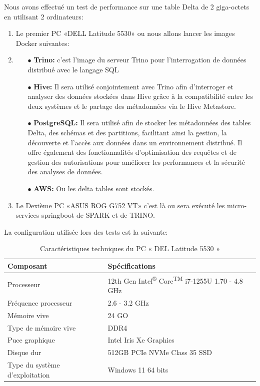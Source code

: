 Nous avons effectué un test de performance sur une table Delta de 2 giga-octets en utilisant 2 ordinateurs:
\begin{enumerate}
    \item Le premier PC «DELL Latitude 5530» ou nous allons lancer les images Docker suivantes:
    \item \begin{enumerate}
        \item[$\bullet$] \textbf{Trino:} c’est l’image du serveur Trino pour l'interrogation de données distribué avec le langage SQL 
        \item[$\bullet$] \textbf{Hive:} Il sera utilisé conjointement avec Trino afin d’interroger et analyser des données stockées dans Hive grâce à la compatibilité entre les deux systèmes et le partage des métadonnées via le Hive Metastore.
        \item[$\bullet$] \textbf{PostgreSQL:} Il sera utilisé afin de stocker les métadonnées des tables Delta, des schémas et des partitions, facilitant ainsi la gestion, la découverte et l'accès aux données dans un environnement distribué. Il offre également des fonctionnalités d'optimisation des requêtes et de gestion des autorisations pour améliorer les performances et la sécurité des analyses de données.
        \item[$\bullet$] \textbf{AWS:} Ou les delta tables sont stockés.
    \end{enumerate}
    \item Le Dexième PC «ASUS ROG G752 VT» c’est là ou sera exécuté les micro-services springboot de SPARK et de TRINO.\@
\end{enumerate}

La configuration utilisée lors des tests est la suivante:
\begin{table}[h]
\centering
\label{tab:caracteristiques}
\begin{tabular}{|l|l|}
\hline
\textbf{Composant} & \textbf{Spécifications} \\ \hline
Processeur & 12th Gen Intel\textsuperscript{®} Core\textsuperscript{TM} i7-1255U 1.70 - 4.8 GHz \\ \hline
Fréquence processeur & 2.6 - 3.2 GHz \\ \hline
Mémoire vive & 24 GO \\ \hline
Type de mémoire vive & DDR4 \\ \hline
Puce graphique & Intel Iris Xe Graphics \\ \hline
Disque dur & 512GB PCIe NVMe Class 35 SSD \\ \hline
Type du système d'exploitation & Windows 11 64 bits \\ \hline
\end{tabular}
\caption{Caractéristiques techniques du PC « DEL Latitude 5530 »}
\end{table}

